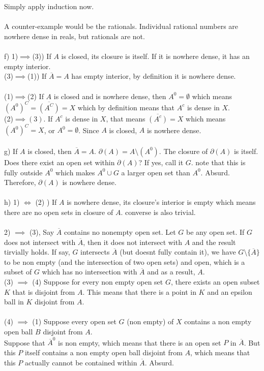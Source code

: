 \documentclass[../Main.tex]{subfiles}
\begin{document}
\\\\ Simply apply induction now.
\\\\ A counter-example would be the rationals. Individual rational numbers are nowhere dense in reals, but rationals are not.
\\\\ f) 1)$\implies$(3)) If $A$ is closed, its closure is itself. If it is nowhere dense, it has an empty interior.
\\ (3)$\implies$(1)) If $\overline{A}=A$ has empty interior, by definition it is nowhere dense.
\\\\ (1)$\implies$(2) If $A$ is closed and is nowhere dense, then $A^0=\emptyset$ which means $(A^0)^C=\overline{(A^C)}=X$ which by definition means that $A^c$ is dense in $X$.
\\ (2)$\implies(3)$. If $A^c$ is dense in $X$, that means $\overline{(A^c)}=X$ which means $(A^0)^C=X$, or $A^0=\emptyset$. Since $A$ is closed, $A$ is nowhere dense.
\\\\ g) If $A$ is closed, then $\overline{A}=A$. $\partial(A)=A \setminus(A^0)$. The closure of $\partial(A)$ is itself. Does there exist an open set within $\partial(A)$? If yes, call it $G$. note that this is fully outside $A^0$ which makes $A^0 \cup G$ a larger open set than $A^0$. Absurd. Therefore, $\partial(A)$ is nowhere dense.
\\\\ h) 1) $\iff$ (2) ) If $A$ is nowhere dense, its closure's interior is empty which means there are no open sets in closure of $A$. converse is also trivial.
\\\\ 2) $\implies$ (3), Say $\overline{A}$ contains no nonempty open set. Let $G$ be any open set. If $G$ does not intersect with $\overline{A}$, then it does not intersect with $A$ and the result tirvially holds. If say, $G$ intersects $\overline{A}$ (but doesnt fully contain it), we have $G \setminus\{\overline{A}\}$ to be non empty (and the intersection of two open sets) and open, which is a subset of $G$ which has no intersection with $\overline{A}$ and as a result, $A$.
\\ (3) $\implies$ (4) Suppose for every non empty open set $G$, there exists an open subset $K$ that is disjoint from $A$. This means that there is a point in $K$ and an epsilon ball in $K$ disjoint from $A$.
\\\\ (4) $\implies $ (1) Suppose every open set $G$ (non empty) of $X$ contains a non empty open ball $B$ disjoint from $A$. 
\\ Suppose that $\overline{A}^0$ is non empty, which means that there is an open set $P$ in $\overline{A}$. But this $P$ itself contains a non empty open ball disjoint from $A$, which means that this $P$ actually cannot be contained within $\overline{A}$. Absurd. 
\end{document}
